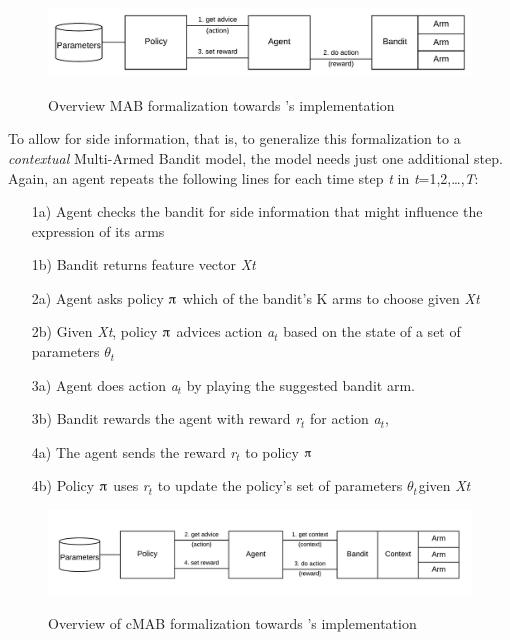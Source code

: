 \documentclass[nojss]{jss}\usepackage[]{graphicx}\usepackage[]{color}
\begin{document}
\begin{figure}[H]
  \centering
    \includegraphics[width=.99\textwidth]{fig/mab_chart}
    \label{fig:mab_chart}
      \caption{Overview MAB formalization towards 's implementation}
\end{figure}

To allow for side information, that is, to generalize this formalization to a \textit{contextual} Multi-Armed Bandit model, the model needs just one additional step. Again, an agent repeats the following lines for each time step \textit{t} in \textit{t}=1,2,{\dots},\textit{T}:

\begin{enumerate}
         \item[1a)] Agent checks the bandit for side information that might influence the expression of its arms
         \item[1b)] Bandit returns feature vector \textit{Xt }
         \item[2a)] Agent asks policy $\piup$ which of the bandit's K arms to choose given \textit{Xt}
         \item[2b)] Given \textit{Xt}, policy $\piup$ advices action \textit{a${}_{t}$} based on the state of a set of parameters \textit{$\theta$${}_{t}$${}_{  }$}
         \item[3a)] Agent does action \textit{a${}_{t}$} by playing the suggested bandit arm.
         \item[3b)] Bandit rewards the agent with reward \textit{r${}_{t}$ }for action \textit{a${}_{t}$},
         \item[4a)] The agent sends the reward\textit{ r${}_{t}$ }to policy $\piup$
         \item[4b)] Policy $\piup$ uses \textit{r${}_{t}$} to update the policy's set of parameters\textit{ $\theta$${}_{t}$${}_{  }$}given \textit{Xt}
\end{enumerate}

\begin{figure}[H]
  \centering
    \includegraphics[width=.99\textwidth]{fig/cmab_chart}
    \label{fig:cmab_chart}
      \caption{Overview of cMAB formalization towards 's implementation}
\end{figure}
\end{document}
